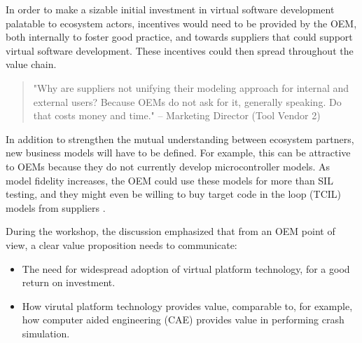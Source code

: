 In order to make a sizable initial investment in virtual software development palatable to ecosystem actors, incentives would need to be provided by the OEM, both internally to foster good practice, and towards suppliers that could support virtual software development. These incentives could then spread throughout the value chain.

\begin{quote}
"Why are suppliers not unifying their modeling approach for internal and external users? Because OEMs do not ask for it, generally speaking. Do that costs money and time."
-- Marketing Director (Tool Vendor 2)
\end{quote}


In addition to strengthen the mutual understanding between ecosystem partners, new business models will have to be defined.
For example, this can be attractive to OEMs because they do not currently develop microcontroller models.
As model fidelity increases, the OEM could use these models for more than SIL testing, and they might even be willing to buy target code in the loop (TCIL) models from suppliers \cite{Knauss2014d}.

During the workshop, the discussion emphasized that from an OEM point of view, a clear value proposition needs to communicate:
\begin{itemize}
\item The need for widespread adoption of virtual platform technology, for a good return on investment. 
\item How virutal platform technology provides value, comparable to, for example, how computer aided engineering (CAE) provides value in performing crash simulation.
\end{itemize}


